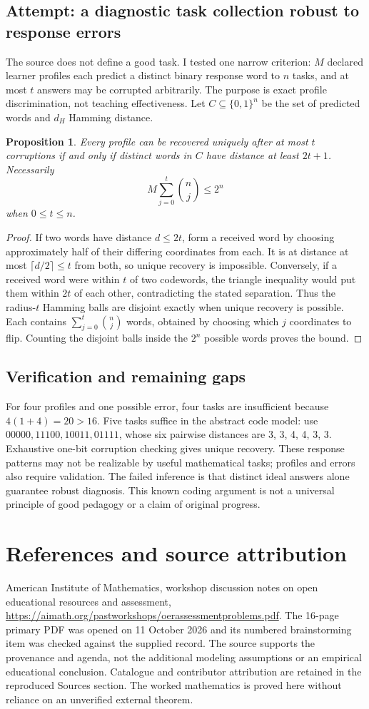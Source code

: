 \documentclass[11pt]{article}
\newtheorem{proposition}{Proposition}
\begin{document}
\subsection{Attempt: a diagnostic task collection robust to response errors}
The source does not define a good task. I tested one narrow criterion: $M$ declared learner profiles each predict a distinct binary response word to $n$ tasks, and at most $t$ answers may be corrupted arbitrarily. The purpose is exact profile discrimination, not teaching effectiveness. Let $C\subseteq\{0,1\}^n$ be the set of predicted words and $d_H$ Hamming distance.
\begin{proposition}
Every profile can be recovered uniquely after at most $t$ corruptions if and only if distinct words in $C$ have distance at least $2t+1$. Necessarily
\[
M\sum_{j=0}^t\binom nj\le2^n
\]
when $0\le t\le n$.
\end{proposition}
\begin{proof}
If two words have distance $d\le2t$, form a received word by choosing approximately half of their differing coordinates from each. It is at distance at most $\lceil d/2\rceil\le t$ from both, so unique recovery is impossible. Conversely, if a received word were within $t$ of two codewords, the triangle inequality would put them within $2t$ of each other, contradicting the stated separation. Thus the radius-$t$ Hamming balls are disjoint exactly when unique recovery is possible. Each contains $\sum_{j=0}^t\binom nj$ words, obtained by choosing which $j$ coordinates to flip. Counting the disjoint balls inside the $2^n$ possible words proves the bound.
\end{proof}
\subsection{Verification and remaining gaps}
For four profiles and one possible error, four tasks are insufficient because $4(1+4)=20>16$. Five tasks suffice in the abstract code model: use $00000,11100,10011,01111$, whose six pairwise distances are 3, 3, 4, 4, 3, 3. Exhaustive one-bit corruption checking gives unique recovery. These response patterns may not be realizable by useful mathematical tasks; profiles and errors also require validation. The failed inference is that distinct ideal answers alone guarantee robust diagnosis. This known coding argument is not a universal principle of good pedagogy or a claim of original progress.

\section{References and source attribution}
American Institute of Mathematics, workshop discussion notes on open educational resources and assessment, \url{https://aimath.org/pastworkshops/oerassessmentproblems.pdf}. The 16-page primary PDF was opened on 11 October 2026 and its numbered brainstorming item was checked against the supplied record. The source supports the provenance and agenda, not the additional modeling assumptions or an empirical educational conclusion. Catalogue and contributor attribution are retained in the reproduced Sources section. The worked mathematics is proved here without reliance on an unverified external theorem.
\end{document}
